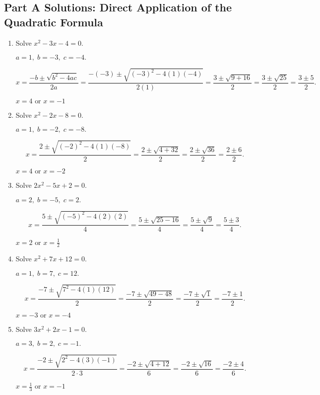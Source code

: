 \documentclass[12pt]{article}
\begin{document}
\subsection*{Part A Solutions: Direct Application of the Quadratic Formula}
\begin{enumerate}
  \item Solve \(x^2 - 3x - 4 = 0.\)

  \(a = 1,\; b = -3,\; c = -4.\)

  \[
  x = \frac{-b \pm \sqrt{b^2 - 4ac}}{2a}
  = \frac{-(-3) \pm \sqrt{(-3)^2 - 4(1)(-4)}}{2(1)}
  = \frac{3 \pm \sqrt{9 + 16}}{2}
  = \frac{3 \pm \sqrt{25}}{2}
  = \frac{3 \pm 5}{2}.
  \]

  \(\boxed{x = 4 \text{ or } x = -1}\)

  \item Solve \(x^2 - 2x - 8 = 0.\)

  \(a = 1,\; b = -2,\; c = -8.\)

  \[
  x = \frac{2 \pm \sqrt{(-2)^2 - 4(1)(-8)}}{2}
  = \frac{2 \pm \sqrt{4 + 32}}{2}
  = \frac{2 \pm \sqrt{36}}{2}
  = \frac{2 \pm 6}{2}.
  \]

  \(\boxed{x = 4 \text{ or } x = -2}\)

  \item Solve \(2x^2 - 5x + 2 = 0.\)

  \(a = 2,\; b = -5,\; c = 2.\)

  \[
  x = \frac{5 \pm \sqrt{(-5)^2 - 4(2)(2)}}{4}
  = \frac{5 \pm \sqrt{25 - 16}}{4}
  = \frac{5 \pm \sqrt{9}}{4}
  = \frac{5 \pm 3}{4}.
  \]

  \(\boxed{x = 2 \text{ or } x = \tfrac{1}{2}}\)

  \item Solve \(x^2 + 7x + 12 = 0.\)

  \(a = 1,\; b = 7,\; c = 12.\)

  \[
  x = \frac{-7 \pm \sqrt{7^2 - 4(1)(12)}}{2}
  = \frac{-7 \pm \sqrt{49 - 48}}{2}
  = \frac{-7 \pm \sqrt{1}}{2}
  = \frac{-7 \pm 1}{2}.
  \]

  \(\boxed{x = -3 \text{ or } x = -4}\)

  \item Solve \(3x^2 + 2x - 1 = 0.\)

  \(a = 3,\; b = 2,\; c = -1.\)

  \[
  x = \frac{-2 \pm \sqrt{2^2 - 4(3)(-1)}}{2 \cdot 3}
  = \frac{-2 \pm \sqrt{4 + 12}}{6}
  = \frac{-2 \pm \sqrt{16}}{6}
  = \frac{-2 \pm 4}{6}.
  \]

  \(\boxed{x = \tfrac{1}{3} \text{ or } x = -1}\)
\end{enumerate}
\end{document}
